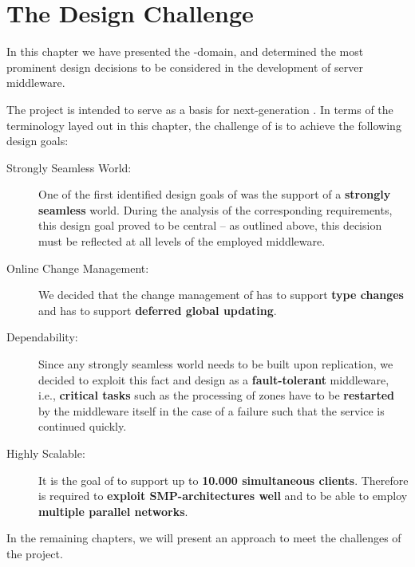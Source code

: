 \documentclass[a4paper, 10pt]{book}
\begin{document}
            \section{The \SYNEIGHT Design Challenge}

            In this chapter we have presented the \MMORG-domain, and determined 
            the most prominent design decisions to be considered in the
            development of \MMORG server middleware. 

            The \SYNEIGHT project is intended to serve as a basis for next-generation
            \MMORGS.  In terms of the terminology layed out in this chapter, the
            challenge of \SYNEIGHT is to achieve the following design goals:
            \begin{description}
                \item[Strongly Seamless World:] One of the first identified design
                    goals of \SYNEIGHT was the support of a \textbf{strongly seamless}
                    world. During the analysis of the corresponding requirements, this
                    design goal proved to be central -- as outlined above, this decision
                    must be reflected at all levels of the employed middleware.
                \item[Online Change Management:] We decided that the change management
                    of \SYNEIGHT has to support \textbf{type changes} and has to support
                    \textbf{deferred global updating}.
                \item[Dependability:] Since any strongly seamless world needs to be
                    built upon replication, we decided to exploit this fact and design
                    \SYNEIGHT as a \textbf{fault-tolerant} middleware, i.e.,
                    \textbf{critical tasks} such as the processing of zones have to be
                    \textbf{restarted} by the middleware itself in the case of a failure
                    such that the service is continued quickly.
                \item[Highly Scalable:] It is the goal of \SYNEIGHT to support up to
                    \textbf{10.000 simultaneous clients}. Therefore \SYNEIGHT is required to
                    \textbf{exploit SMP-architectures well} and to be able to employ
                    \textbf{multiple parallel networks}. 
            \end{description}

            In the remaining chapters, we will present an approach to meet
            the challenges of the \SYNEIGHT project.
\end{document}
